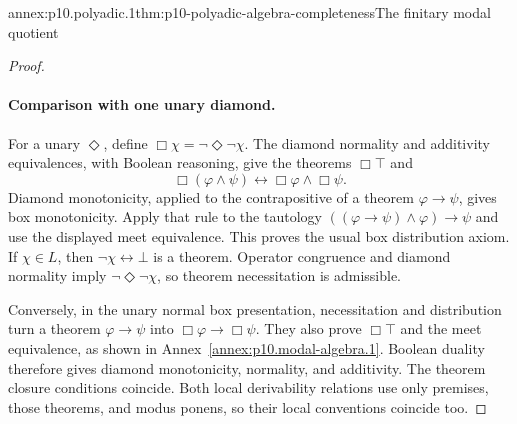 \begin{annexitem}{annex:p10.polyadic.1}{thm:p10-polyadic-algebra-completeness}{The finitary modal quotient}
\begin{proof}
\paragraph{Comparison with one unary diamond.}
For a unary \(\Diamond\), define \(\Box\chi=\neg\Diamond\neg\chi\).
The diamond normality and additivity equivalences, with Boolean
reasoning, give the theorems \(\Box\top\) and
\[
 \Box(\varphi\wedge\psi)
                 \leftrightarrow\Box\varphi\wedge\Box\psi.
\]
Diamond monotonicity, applied to the contrapositive of a theorem
\(\varphi\to\psi\), gives box monotonicity.
Apply that rule to the tautology
\(((\varphi\to\psi)\wedge\varphi)\to\psi\) and use the displayed
meet equivalence.  This proves the usual box distribution axiom.
If \(\chi\in L\), then \(\neg\chi\leftrightarrow\bot\) is a
theorem.  Operator congruence and diamond normality imply
\(\neg\Diamond\neg\chi\), so theorem necessitation is admissible.

Conversely, in the unary normal box presentation, necessitation and
distribution turn a theorem \(\varphi\to\psi\) into
\(\Box\varphi\to\Box\psi\).
They also prove \(\Box\top\) and the meet equivalence, as shown in
Annex~\ref{annex:p10.modal-algebra.1}.
Boolean duality therefore gives diamond monotonicity, normality,
and additivity.  The theorem closure conditions coincide.
Both local derivability relations use only premises, those theorems,
and modus ponens, so their local conventions coincide too.
\end{proof}
\end{annexitem}

